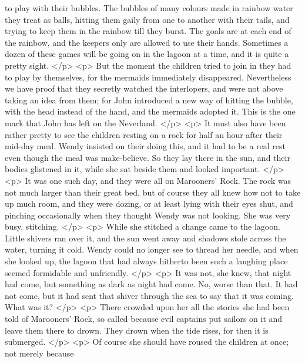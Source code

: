       to play with their bubbles. The bubbles of many colours made in rainbow
      water they treat as balls, hitting them gaily from one to another with
      their tails, and trying to keep them in the rainbow till they burst. The
      goals are at each end of the rainbow, and the keepers only are allowed to
      use their hands. Sometimes a dozen of these games will be going on in the
      lagoon at a time, and it is quite a pretty sight.
    </p>
    <p>
      But the moment the children tried to join in they had to play by
      themselves, for the mermaids immediately disappeared. Nevertheless we have
      proof that they secretly watched the interlopers, and were not above
      taking an idea from them; for John introduced a new way of hitting the
      bubble, with the head instead of the hand, and the mermaids adopted it.
      This is the one mark that John has left on the Neverland.
    </p>
    <p>
      It must also have been rather pretty to see the children resting on a rock
      for half an hour after their mid-day meal. Wendy insisted on their doing
      this, and it had to be a real rest even though the meal was make-believe.
      So they lay there in the sun, and their bodies glistened in it, while she
      sat beside them and looked important.
    </p>
    <p>
      It was one such day, and they were all on Marooners' Rock. The rock was
      not much larger than their great bed, but of course they all knew how not
      to take up much room, and they were dozing, or at least lying with their
      eyes shut, and pinching occasionally when they thought Wendy was not
      looking. She was very busy, stitching.
    </p>
    <p>
      While she stitched a change came to the lagoon. Little shivers ran over
      it, and the sun went away and shadows stole across the water, turning it
      cold. Wendy could no longer see to thread her needle, and when she looked
      up, the lagoon that had always hitherto been such a laughing place seemed
      formidable and unfriendly.
    </p>
    <p>
      It was not, she knew, that night had come, but something as dark as night
      had come. No, worse than that. It had not come, but it had sent that
      shiver through the sea to say that it was coming. What was it?
    </p>
    <p>
      There crowded upon her all the stories she had been told of Marooners'
      Rock, so called because evil captains put sailors on it and leave them
      there to drown. They drown when the tide rises, for then it is submerged.
    </p>
    <p>
      Of course she should have roused the children at once; not merely because
